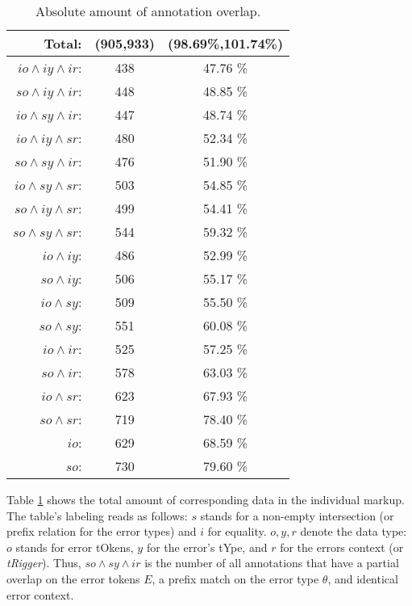 \documentclass{scrartcl}
\begin{document}
\begin{table}
  \centering
\begin{tabular}{r|c|c}
  Total: & (905,933)& (98.69\%,101.74\%)\\\hline
  $io \wedge iy \wedge ir$:& 438 & 47.76 \%\\
  $so \wedge iy \wedge ir$:& 448 & 48.85 \%\\
  $io \wedge sy \wedge ir$:& 447 & 48.74 \%\\
  $io \wedge iy \wedge sr$:& 480 & 52.34 \%\\
  $so \wedge sy \wedge ir$:& 476 & 51.90 \%\\
  $io \wedge sy \wedge sr$:& 503 & 54.85 \%\\
  $so \wedge iy \wedge sr$:& 499 & 54.41 \%\\
  $so \wedge sy \wedge sr$:& 544 & 59.32 \%\\
  $     io \wedge iy$:& 486      & 52.99 \%\\
  $     so \wedge iy$:& 506      & 55.17 \%\\
  $     io \wedge sy$:& 509      & 55.50 \%\\
  $     so \wedge sy$:& 551      & 60.08 \%\\
  $     io \wedge ir$:& 525      & 57.25 \%\\
  $     so \wedge ir$:& 578      & 63.03 \%\\
  $     io \wedge sr$:& 623      & 67.93 \%\\
  $     so \wedge sr$:& 719      & 78.40 \%\\
  $          io$:& 629           & 68.59 \%\\
  $          so$:& 730           & 79.60 \%\\
\end{tabular}
\caption{Absolute amount of annotation overlap.}\label{tab:1}

\end{table}

Table \ref{tab:1} shows the total amount of corresponding data in the individual
markup. The table's labeling reads as follows: $s$ stands for a non-empty
intersection (or prefix relation for the error types) and $i$ for equality.
$o,y,r$ denote the data type: $o$ stands for error tOkens, $y$ for the error's
tYpe, and $r$ for the errors context (or \textit{tRigger}). Thus, $so\wedge
sy\wedge ir$ is the number of all annotations that have a partial overlap on the
error tokens $E$, a prefix match on the error type $\theta$, and identical error
context.
\end{document}
